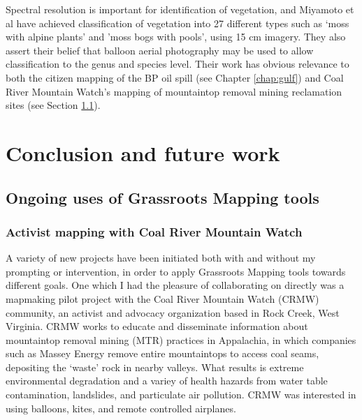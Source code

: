 \documentclass[11pt]{report}
\begin{document}

Spectral resolution is important for identification of vegetation, and Miyamoto et al have achieved classification of vegetation into 27 different types such as `moss with alpine plants' and 'moss bogs with pools', using 15 cm imagery. They also assert their belief that balloon aerial photography may be used to allow classification to the genus and species level. \cite{miyamoto2004use} Their work has obvious relevance to both the citizen mapping of the BP oil spill (see Chapter \ref{chap:gulf}) and Coal River Mountain Watch's mapping of mountaintop removal mining reclamation sites (see Section \ref{sec:ongoinguses}).

\chapter{Conclusion and future work}

\section{Ongoing uses of Grassroots Mapping tools}
\label{sec:ongoinguses}

\subsection{Activist mapping with Coal River Mountain Watch}

A variety of new projects have been initiated both with and without my prompting or intervention, in order to apply Grassroots Mapping tools towards different goals. One which I had the pleasure of collaborating on directly was a mapmaking pilot project with the Coal River Mountain Watch (CRMW) community, an activist and advocacy organization based in Rock Creek, West Virginia. CRMW works to educate and disseminate information about mountaintop removal mining (MTR) practices in Appalachia, in which companies such as Massey Energy remove entire mountaintops to access coal seams, depositing the `waste' rock in nearby valleys. What results is extreme environmental degradation and a variey of health hazards from water table contamination, landslides, and particulate air pollution. CRMW was interested in using balloons, kites, and remote controlled airplanes. 

\end{document}
